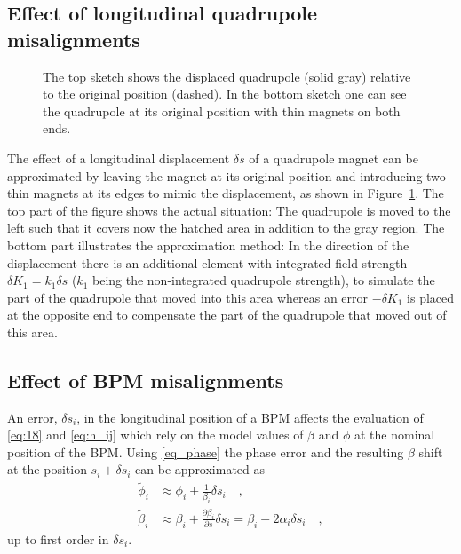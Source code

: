 \subsection{Effect of longitudinal quadrupole misalignments}

\begin{figure}
    \centering
    
	\caption{
        The top sketch shows the displaced quadrupole (solid gray) relative to the original position
        (dashed). In the bottom sketch one can see the quadrupole at its original position with thin
        magnets on both ends.
    }
	\label{fig:quadmisal}
\end{figure}
%
The effect of a longitudinal displacement $ \delta s $ of a quadrupole magnet can be approximated by
leaving the magnet at its original position and introducing two thin magnets at its edges to mimic
the displacement, as shown in Figure~\ref{fig:quadmisal}.
The top part of the figure shows the actual situation:
The quadrupole is moved to the left such that it covers now the hatched area in addition to the gray
region. 
The bottom part illustrates the approximation method:
In the direction of the displacement there is an additional element with integrated field strength
$ \delta K_1 = k_1\delta s $ ($k_1$ being the 
non-integrated quadrupole strength), to simulate the part of the quadrupole that moved into this area
whereas an error 
$ -\delta K_1 $ is placed at the opposite end to compensate the part of the quadrupole that moved out
of this area.



\subsection{Effect of BPM misalignments}

An error, $ \delta s_i $, in the longitudinal position of
a BPM affects the evaluation of \eqref{eq:18} and \eqref{eq:h_ij} which rely on the model
values of $ \beta $ and $ \phi $ at the nominal position of the BPM.
Using \eqref{eq_phase} the phase error and the resulting $\beta$ shift at the position $s_i + \delta s_i$ can be approximated as
%
\begin{align}
\tilde{\phi}_i &\approx \phi_i + \frac{1}{\beta_i}\delta s_i\quad , 
\label{eq:Dphi} \\
\tilde{\beta}_i &\approx \beta_i + \frac{\partial \beta_i}{\partial s} \delta s_i  = \beta_i - 2\alpha_i \delta s_i \quad , \label{eq:Dbeta}
\end{align}
%
up to first order in $ \delta s_i $.

